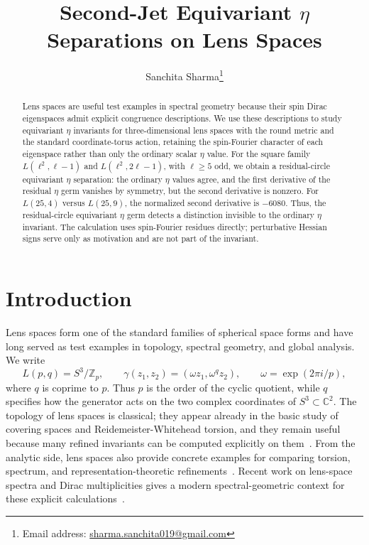 \documentclass{article}
\title{Second-Jet Equivariant $\eta$ Separations on Lens Spaces}
\author{Sanchita Sharma\thanks{Email address: \href{mailto:sharma.sanchita019@gmail.com}{sharma.sanchita019@gmail.com}}}
\date{}
\theoremstyle{definition}
\numberwithin{equation}{section}
\begin{document}
\maketitle


\begin{abstract}
Lens spaces are useful test examples in spectral geometry because their spin Dirac eigenspaces admit explicit congruence descriptions.  We use these descriptions to study equivariant $\eta$ invariants for three-dimensional lens spaces with the round metric and the standard coordinate-torus action, retaining the spin-Fourier character of each eigenspace rather than only the ordinary scalar $\eta$ value.  For the square family $L(\ell^2,\ell-1)$ and $L(\ell^2,2\ell-1)$, with $\ell\geq 5$ odd, we obtain a residual-circle equivariant $\eta$ separation: the ordinary $\eta$ values agree, and the first derivative of the residual $\eta$ germ vanishes by symmetry, but the second derivative is nonzero.  For $L(25,4)$ versus $L(25,9)$, the normalized second derivative is $-6080$.  Thus, the residual-circle equivariant $\eta$ germ detects a distinction invisible to the ordinary $\eta$ invariant.  The calculation uses spin-Fourier residues directly; perturbative Hessian signs serve only as motivation and are not part of the invariant.
\end{abstract}

\tableofcontents

\section{Introduction}

Lens spaces form one of the standard families of spherical space forms and have long served as test examples in topology, spectral geometry, and global analysis.  We write
\begin{equation}
L(p,q)=S^3/\mathbb Z_p,
\qquad
\gamma(z_1,z_2)=(\omega z_1,\omega^q z_2),
\qquad
\omega=\exp(2\pi i/p),
\end{equation}
where $q$ is coprime to $p$.  Thus $p$ is the order of the cyclic quotient, while $q$ specifies how the generator acts on the two complex coordinates of $S^3\subset \mathbb C^2$.  The topology of lens spaces is classical; they appear already in the basic study of covering spaces and Reidemeister-Whitehead torsion, and they remain useful because many refined invariants can be computed explicitly on them~\cite{HatcherAlgebraicTopology,MilnorWhiteheadTorsion}. From the analytic side, lens spaces also provide concrete examples for comparing torsion, spectrum, and representation-theoretic refinements~\cite{RayLensTorsion,GilkeySpherical}.  Recent work on lens-space spectra and Dirac multiplicities gives a modern spectral-geometric context for these explicit calculations~\cite{BoldtDiracLensPublished,BoldtLauretDiracMultiplicities,LauretMiatelloRossettiRecentLensSpectra}. 
\end{document}
